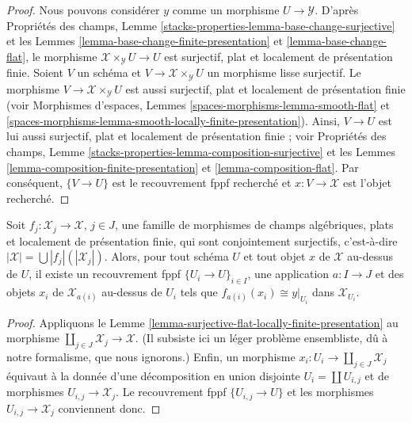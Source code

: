 \begin{proof}
Nous pouvons considérer $y$ comme un morphisme $U \to \mathcal{Y}$. D'après
Propriétés des champs, Lemme
\ref{stacks-properties-lemma-base-change-surjective}
et les Lemmes \ref{lemma-base-change-finite-presentation} et
\ref{lemma-base-change-flat}, le morphisme
$\mathcal{X} \times_\mathcal{Y} U \to U$ est surjectif, plat et localement de
présentation finie. Soient $V$ un schéma et
$V \to \mathcal{X} \times_\mathcal{Y} U$ un morphisme lisse surjectif.
Le morphisme $V \to \mathcal{X} \times_\mathcal{Y} U$ est aussi surjectif,
plat et localement de présentation finie (voir
Morphismes d'espaces, Lemmes
\ref{spaces-morphisms-lemma-smooth-flat} et
\ref{spaces-morphisms-lemma-smooth-locally-finite-presentation}). Ainsi,
$V \to U$ est lui aussi surjectif, plat et localement de présentation finie ;
voir Propriétés des champs, Lemme
\ref{stacks-properties-lemma-composition-surjective}
et les Lemmes \ref{lemma-composition-finite-presentation} et
\ref{lemma-composition-flat}. Par conséquent, $\{V \to U\}$ est le
recouvrement fppf recherché et $x : V \to \mathcal{X}$ est l'objet recherché.
\end{proof}

\begin{lemma}
\label{lemma-surjective-family-flat-locally-finite-presentation}
Soit $f_j : \mathcal{X}_j \to \mathcal{X}$, $j \in J$, une famille de
morphismes de champs algébriques, plats et localement de présentation finie,
qui sont conjointement surjectifs, c'est-à-dire
$|\mathcal{X}| = \bigcup |f_j|(|\mathcal{X}_j|)$.
Alors, pour tout schéma $U$ et tout objet $x$ de $\mathcal{X}$ au-dessus de
$U$, il existe un recouvrement fppf $\{U_i \to U\}_{i \in I}$, une application
$a : I \to J$ et des objets $x_i$ de $\mathcal{X}_{a(i)}$ au-dessus de $U_i$
tels que $f_{a(i)}(x_i) \cong y|_{U_i}$ dans $\mathcal{X}_{U_i}$.
\end{lemma}

\begin{proof}
Appliquons le Lemme
\ref{lemma-surjective-flat-locally-finite-presentation} au morphisme
$\coprod_{j \in J} \mathcal{X}_j \to \mathcal{X}$. (Il subsiste ici un léger
problème ensembliste, dû à notre formalisme, que nous ignorons.) Enfin, un
morphisme $x_i : U_i \to \coprod_{j \in J} \mathcal{X}_j$ équivaut à la
donnée d'une décomposition en union disjointe
$U_i = \coprod U_{i, j}$ et de morphismes
$U_{i, j} \to \mathcal{X}_j$. Le recouvrement fppf
$\{U_{i, j} \to U\}$ et les morphismes
$U_{i, j} \to \mathcal{X}_j$ conviennent donc.
\end{proof}


